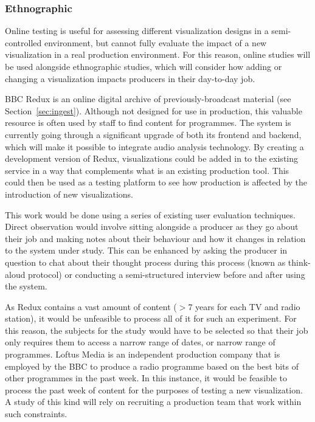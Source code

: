 \subsubsection{Ethnographic}\label{sec:planethno}
Online testing is useful for assessing different visualization designs in a
semi-controlled environment, but cannot fully evaluate the impact of a new
visualization in a real production environment. For this reason, online studies
will be used alongside ethnographic studies, which will consider how adding or
changing a visualization impacts producers in their day-to-day job.

BBC Redux is an online digital archive of previously-broadcast material (see
Section~\ref{sec:ingest}). Although not designed for use in production, this
valuable resource is often used by staff to find content for programmes. The
system is currently going through a significant upgrade of both its frontend
and backend, which will make it possible to integrate audio analysis
technology. By creating a development version of Redux, visualizations could be
added in to the existing service in a way that complements what is an existing
production tool. This could then be used as a testing platform to see how
production is affected by the introduction of new visualizations.

This work would be done using a series of existing user evaluation techniques.
Direct observation would involve sitting alongside a producer as they go about
their job and making notes about their behaviour and how it changes in relation
to the system under study. This can be enhanced by asking the producer in
question to chat about their thought process during this process (known as
think-aloud protocol) or conducting a semi-structured interview before and
after using the system.

As Redux contains a vast amount of content ($>$7 years for each TV and radio
station), it would be unfeasible to process all of it for such an experiment.
For this reason, the subjects for the study would have to be selected so that
their job only requires them to access a narrow range of dates, or narrow range
of programmes. Loftus Media is an independent production company that is
employed by the BBC to produce a radio programme based on the best bits of
other programmes in the past week. In this instance, it would be feasible to
process the past week of content for the purposes of testing a new
visualization. A study of this kind will rely on recruiting a production team
that work within such constraints.

